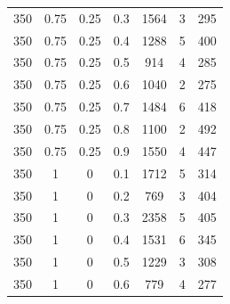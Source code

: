 \documentclass[a4paper,oneside,14pt]{extreport}
\begin{document}
\begin{table}[h]
\begin{center}
\begin{tabular}{|c|c|c|c|c|c|c|}
		350 & 0.75 & 0.25 & 0.3 & 1564 & 3 & 295 \\
		350 & 0.75 & 0.25 & 0.4 & 1288 & 5 & 400 \\
		350 & 0.75 & 0.25 & 0.5 & 914 & 4 & 285 \\
		350 & 0.75 & 0.25 & 0.6 & 1040 & 2 & 275 \\
		350 & 0.75 & 0.25 & 0.7 & 1484 & 6 & 418 \\
		350 & 0.75 & 0.25 & 0.8 & 1100 & 2 & 492 \\
		350 & 0.75 & 0.25 & 0.9 & 1550 & 4 & 447 \\
		350 & 1 & 0 & 0.1 & 1712 & 5 & 314 \\
		350 & 1 & 0 & 0.2 & 769 & 3 & 404 \\
		350 & 1 & 0 & 0.3 & 2358 & 5 & 405 \\
		350 & 1 & 0 & 0.4 & 1531 & 6 & 345 \\
		350 & 1 & 0 & 0.5 & 1229 & 3 & 308 \\
		350 & 1 & 0 & 0.6 & 779 & 4 & 277 \\
		\hline	
	\end{tabular}
\end{center}
\end{table}
\end{document}
